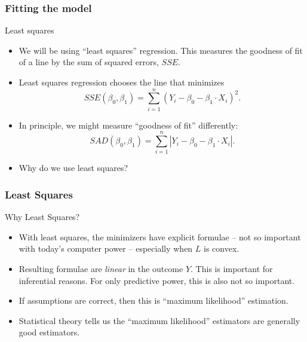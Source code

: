 \documentclass[handout]{beamer}
\begin{document}

   \begin{frame} \frametitle{Fitting the model}

   \begin{block}
   {Least squares}
   \begin{itemize}
   \item We will be using ``least squares'' regression. This measures
   the goodness of fit of a line by the sum of squared errors, $SSE$.
   \item Least squares regression chooses the line that minimizes
   $$
   SSE(\beta_0, \beta_1) = \sum_{i=1}^n (Y_i - \beta_0 - \beta_1 \cdot X_i)^2.$$

   \item In principle, we might measure ``goodness of fit'' differently:
   $$
   SAD(\beta_0, \beta_1) = \sum_{i=1}^n |Y_i - \beta_0 - \beta_1 \cdot X_i|.$$

   \item Why do we use least squares?
   \end{itemize}
   \end{block}
   \end{frame}


   \begin{frame} \frametitle{Least Squares}

   \begin{block}
   {Why Least Squares?}
   \begin{itemize}[<+->]
   \item With least squares, the minimizers have explicit formulae -- not so important with today's computer power -- especially when $L$ is convex.
   \item Resulting formulae are {\em linear} in the outcome $Y$. This is important
   for inferential reasons. For only predictive power, this is also not so important.
   \item If assumptions are correct, then this is ``maximum likelihood'' estimation.

   \item Statistical theory tells us the ``maximum likelihood'' estimators are generally good estimators.
   \end{itemize}
   \end{block}
   \end{frame}
\end{document}
